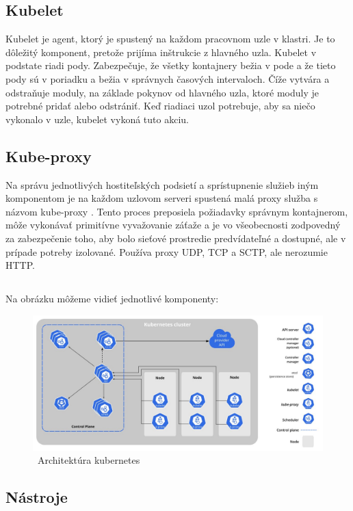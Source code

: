 \subsection*{Kubelet}
Kubelet je agent, ktorý je spustený na každom pracovnom uzle v klastri. Je to dôležitý komponent, pretože prijíma inštrukcie z hlavného uzla. Kubelet v podstate riadi pody. Zabezpečuje, že všetky kontajnery bežia v pode a že tieto pody sú v poriadku a bežia v správnych časových intervaloch. Číže vytvára a odstraňuje moduly, na základe pokynov od hlavného uzla, ktoré moduly je potrebné pridať alebo odstrániť. Keď riadiaci uzol potrebuje, aby sa niečo vykonalo v uzle, kubelet vykoná tuto akciu.

\subsection*{Kube-proxy}
Na správu jednotlivých hostiteľských podsietí a sprístupnenie služieb iným komponentom je na každom uzlovom serveri spustená malá proxy služba s názvom kube-proxy . Tento proces preposiela požiadavky správnym kontajnerom, môže vykonávať primitívne vyvažovanie záťaže a je vo všeobecnosti zodpovedný za zabezpečenie toho, aby bolo sieťové prostredie predvídateľné a dostupné, ale v prípade potreby izolované. Používa proxy UDP, TCP a SCTP, ale nerozumie HTTP.

\subsection*{}
Na obrázku môžeme vidieť jednotlivé komponenty:
\begin{figure}[!ht]
    \includegraphics[width=.9\textwidth]{figures/kubernetesarchi}
    \caption{\ Architektúra kubernetes \cite{archkuber} \label{o:latex_friendly_zone}}
\end{figure}

\subsection{Nástroje}

